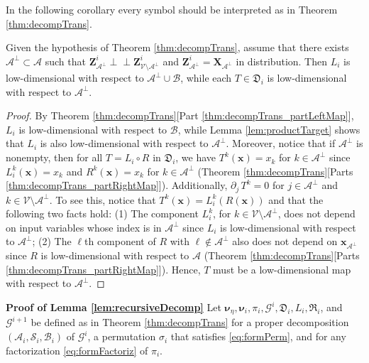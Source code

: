 \documentclass[twoside,11pt]{article}
\newcommand{\orth}{ \perp\!\!\!\perp }  %
\newcommand{\genm}{\boldsymbol{\nu} }   %
\newcommand{\Bc}{\mathcal{B}}
\newcommand{\Vc}{\mathcal{V}}
\newcommand{\Ac}{\mathcal{A}}
\newcommand{\Sc}{\mathcal{S}}
\newcommand{\Xb}{\boldsymbol{X}}
\newcommand{\xb}{\boldsymbol{x}}
\newcommand{\Zb}{\boldsymbol{Z}}
\newcommand{\Gcb}{\boldsymbol{\mathcal{G}}}
\newcommand{\lmap}{L} %
\newcommand{\rmap}{R} %
\newcommand{\decset}{\mathfrak{D}} %
\newcommand{\Aset}{ \Ac }
\newcommand{\Bset}{ \Bc }
\newcommand{\Sset}{ \Sc }
\newcommand{\Aind}{ \Aset^\perp }
\begin{document}
In the following corollary every symbol should be interpreted as in Theorem \ref{thm:decompTrans}.

\begin{corollary}
  \label{cor:lowdim_lmap}
  Given the hypothesis of Theorem \ref{thm:decompTrans}, 
  assume  that there exists %
  $\Aind \subset \Aset$ such that 
  $\Zb^i_{\Aind}\orth \Zb^i_{\Vc \setminus \Aind}$ and 
  $\Zb^i_{\Aind} =  \Xb_{\Aind} $ in distribution.
  Then  $\lmap_i$ is low-dimensional with respect to $\Aind \cup \Bset$, 
  while each $T\in \decset_i$ 
  is low-dimensional with respect to $\Aind$. 
\end{corollary}
\begin{proof}
%
%
%
%
  By Theorem \ref{thm:decompTrans}[Part \ref{thm:decompTrans_partLeftMap}], 
  $\lmap_i$ is low-dimensional with respect to $\Bset$, while
  Lemma \ref{lem:productTarget} shows that $\lmap_i$ is also  
  low-dimensional with respect to $\Aind$.
  Moreover, notice that if $\Aind$ is nonempty, then for all 
  $T = \lmap_i \circ \rmap$ in $\decset_i$, we have
  $T^k(\xb)=x_k$ for $k\in \Aind$ since $\lmap_i^k (\xb)=x_k$ and
  $\rmap^k(\xb)=x_k$ for $k\in \Aind$  
  (Theorem \ref{thm:decompTrans}[Parts \ref{thm:decompTrans_partRightMap}]).
  Additionally, $\partial_j \, T^k = 0$ for $j \in \Aind$ and 
  $k\in \Vc \setminus \Aind$. To see this, notice that 
  $T^k(\xb)=\lmap_i^k(\rmap(\xb))$ and that the following two facts hold:
  (1) The component
  $\lmap_i^k$, for $k\in \Vc \setminus \Aind$,
  does not depend
  on   input variables whose index is in $\Aind$ since
  $\lmap_i$ is low-dimensional with respect to $\Aind$; 
  (2)
  The $\ell$th component of $\rmap$ with $\ell \notin \Aind$ also does not depend on 
  $\xb_{\Aind}$
  since $\rmap$ is low-dimensional with respect to $\Aset$ 
  (Theorem \ref{thm:decompTrans}[Parts \ref{thm:decompTrans_partRightMap}]).
  Hence, $T$ must be a low-dimensional map with respect to $\Aind$. 
\end{proof}
\smallskip


%
%
%
%
%
%
%
%
%
%
%
%
%
%
%
%
%
%
%
%
%
%
%
%
%
%
%
%
%
%
%
%
%
%
%
%
%
%
%
%
%
%
%
%
%
%
%

%
%
%
%
%
%
%
%
%
%
%
%
%
%
%

%
%
%
%
%
%
%
%
%
%
%
%
%
%
%
%
%
%
%
%
%
%
%
%
%
%
%
%
%
%
%
%
%
%
%
%
%

%
%
%
%
%
%
%
%
%
%
%
%
%
%
%
%
%
%
%
%
%
%
%
%
%
%
%
%
%
%
%
%
%
%

\noindent
{\bf Proof of Lemma \ref{lem:recursiveDecomp}}
Let $\genm_\eta , \genm_i, \pi_i, \Gcb^i, \decset_i,\lmap_i, \mathfrak{R}_i$, 
and $\Gcb^{i+1}$ be defined as in 
Theorem \ref{thm:decompTrans}
for a proper decomposition 
$(\Aset_i,\Sset_i,\Bset_i)$ of  $\Gcb^i$, 
a permutation $\sigma_i$ that satisfies \eqref{eq:formPerm}, and for any
factorization \eqref{eq:formFactoriz} of $\pi_i$.
\end{document}
